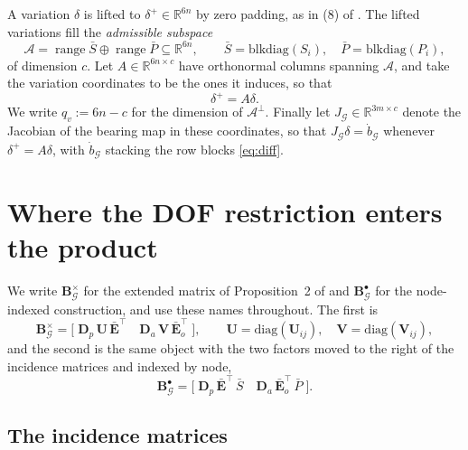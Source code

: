 \documentclass[11pt,a4paper]{article}
\theoremstyle{plain}
\theoremstyle{definition}
\newcommand{\R}{\mathbb{R}}
\newcommand{\Bper}{\mathbf{B}^{\times}}
\newcommand{\Bnode}{\mathbf{B}^{\bullet}}
\newcommand{\Ebar}{\bar{\mathbf{E}}}
\newcommand{\Ebaro}{\bar{\mathbf{E}}_o}
\newcommand{\Dp}{\mathbf{D}_p}
\newcommand{\Da}{\mathbf{D}_a}
\begin{document}
A variation $\delta$ is lifted to $\delta^+\in\R^{6n}$ by zero padding, as in
(8) of \cite{michieletto2021}. The lifted variations fill the
\emph{admissible subspace}
\begin{equation}\label{eq:A}
  \mathcal A=\operatorname{range}\bar S\oplus\operatorname{range}\bar P
  \subseteq\R^{6n},
  \qquad
  \bar S=\mathrm{blkdiag}(S_i),\quad \bar P=\mathrm{blkdiag}(P_i),
\end{equation}
of dimension $c$. Let $A\in\R^{6n\times c}$ have orthonormal columns spanning
$\mathcal A$, and take the variation coordinates to be the ones it induces, so
that
\begin{equation}\label{eq:embed}
  \delta^+=A\delta .
\end{equation}
We write $q_v:=6n-c$ for the dimension of $\mathcal A^\perp$. Finally let
$J_{\mathcal G}\in\R^{3m\times c}$ denote the Jacobian of the bearing map in
these coordinates, so that $J_{\mathcal G}\delta=\dot b_{\mathcal G}$ whenever
$\delta^+=A\delta$, with $\dot b_{\mathcal G}$ stacking the row blocks
\eqref{eq:diff}.

\section{Where the DOF restriction enters the product}\label{sec:expand}

We write $\Bper_{\mathcal G}$ for the extended matrix of Proposition~2 of
\cite{michieletto2021} and $\Bnode_{\mathcal G}$ for the node-indexed
construction, and use these names throughout. The first is
\begin{equation}\label{eq:peredge}
  \Bper_{\mathcal G}=\bigl[\;\Dp\,\mathbf U\,\Ebar^\top\quad
                             \Da\,\mathbf V\,\Ebaro^\top\;\bigr],
  \qquad
  \mathbf U=\mathrm{diag}(\mathbf U_{ij}),\quad
  \mathbf V=\mathrm{diag}(\mathbf V_{ij}),
\end{equation}
and the second is the same object with the two factors moved to the right of
the incidence matrices and indexed by node,
\begin{equation}\label{eq:pernode}
  \Bnode_{\mathcal G}=\bigl[\;\Dp\,\Ebar^\top\,\bar S\quad
                              \Da\,\Ebaro^\top\,\bar P\;\bigr].
\end{equation}

\subsection*{The incidence matrices}
\end{document}
